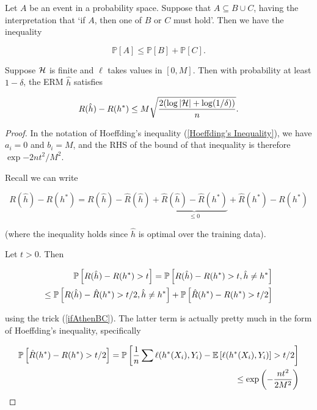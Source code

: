\documentclass[11pt]{scrartcl}
\begin{document}
\begin{remark}
\label{ifAthenBC}
    Let $A$ be an event in a probability space. Suppose that $ A \subseteq B \cup C $, having the interpretation that `if $A$, then one of $B$ or $C$ must hold'. Then we have the inequality 

    \begin{equation}
        \mathbb{ P}[ A ] \le \mathbb{ P}[B] + \mathbb{ P}[C].
    \end{equation}
\end{remark}

\begin{theorem}
    Suppose $\H$ is finite and $\ell$ takes values in $[0,M]$. Then with probability at least $1-\delta$, the ERM $\hat{h}$ satisfies
    
    \begin{equation}
        R(\hat{h}) - R(h^*) \le M \sqrt{\frac{2(\log |\H| + \log(1 / \delta))}{n}}.
    \end{equation}
\begin{proof}
In the notation of Hoeffding's inequality (\ref{Hoeffding's Inequality}), we have $a_i = 0$ and $b_i = M$, and the RHS of the bound of that inequality is therefore $\exp{-2nt^2 / M^2}$.

Recall we can write 

\begin{equation}
    R(\hat{h}) - R(h^*) = R(\hat{h}) - \hat{R}(\hat{h}) + \underbrace{\hat{R}(\hat{h}) - \hat{R}(h^*)}_{\le 0} + \hat{R}(h^*) - R(h^*)
\end{equation}

(where the inequality holds since $\hat{h}$ is optimal over the training data).

Let $t>0$. Then 

\begin{align}
    \P{R(\hat{h}) - R(h^*) > t} = \P{R(\hat{h}) - R(h^*) > t, \hat{h} \neq h^*} \\
    \le \P{R(\hat{h}) - \hat{R}(h^*) > t/2, \hat{h} \neq h^*} + \P{\hat{R}(h^*) - R(h^*) > t/2}
\end{align}

using the trick (\ref{ifAthenBC}). The latter term is actually pretty much in the form of Hoeffding's inequality, specifically

\begin{align}
    \P{\hat{R}(h^*) - R(h^*) > t/2} = \P{ \frac1n \sum \ell(h^*(X_i), Y_i) - \E{\ell(h^*(X_i), Y_i)} > t/2} \\
    \le \exp{-\frac{nt^2}{2M^2}}
\end{align}


\end{proof}
\end{theorem}
\end{document}
